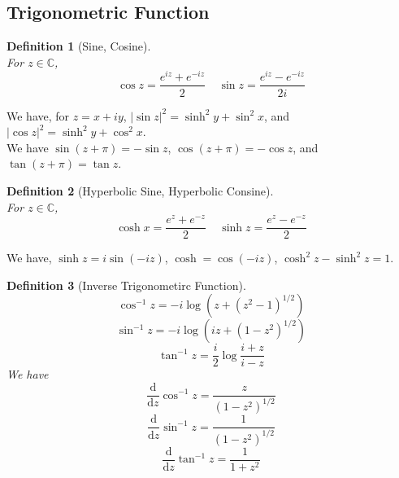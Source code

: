 \documentclass[12pt]{article}
\newcommand{\diff}{\mathrm{d}}
\newtheorem{definition}{Definition}[section]
\theoremstyle{definition}
\begin{document}
\subsection{Trigonometric Function}
\begin{definition}[Sine, Cosine]
\hfill\\\normalfont For $z\in \mathbb{C}$,
\[
\cos z = \frac{e^{iz}+e^{-iz}}{2}\;\;\;\;\sin z =\frac{e^{iz}-e^{-iz}}{2i}
\]
\end{definition}
We have, for $z=x+iy$, $|\sin z|^2 = \sinh^2 y + \sin^2 x$, and $|\cos z|^2 = \sinh^2 y + \cos^2 x$.\\
We have $\sin(z+\pi) = -\sin z$, $\cos(z+\pi)=-\cos z$, and $\tan(z+\pi) = \tan z$.\\
\begin{definition}[Hyperbolic Sine, Hyperbolic Consine]
\hfill\\\normalfont For $z\in \mathbb{C}$, 
\[
\cosh x = \frac{e^z +e^{-z}}{2}\;\;\;\;\sinh z = \frac{e^z - e^{-z}}{2}
\]
\end{definition}
We have, $\sinh z = i\sin(-iz)$, $\cosh = \cos(-iz)$, $\cosh^2 z - \sinh^2 z = 1$.
\begin{definition}[Inverse Trigonometirc Function]
\[
\cos^{-1}z = -i\log(z+(z^2-1)^{1/2})
\]
\[
\sin^{-1}z = -i\log(iz + (1-z^2)^{1/2})
\]
\[
\tan^{-1}z = \frac{i}{2}\log\frac{i+z}{i-z}
\]
We have
\[
\frac{\diff}{\diff z}\cos^{-1}z = \frac{z}{(1-z^2)^{1/2}}
\]
\[
\frac{\diff}{\diff z}\sin^{-1}z = \frac{1}{(1-z^2)^{1/2}}
\]
\[
\frac{\diff}{\diff z}\tan^{-1}z = \frac{1}{1+z^2}
\]
\end{definition}
\clearpage
\end{document}
